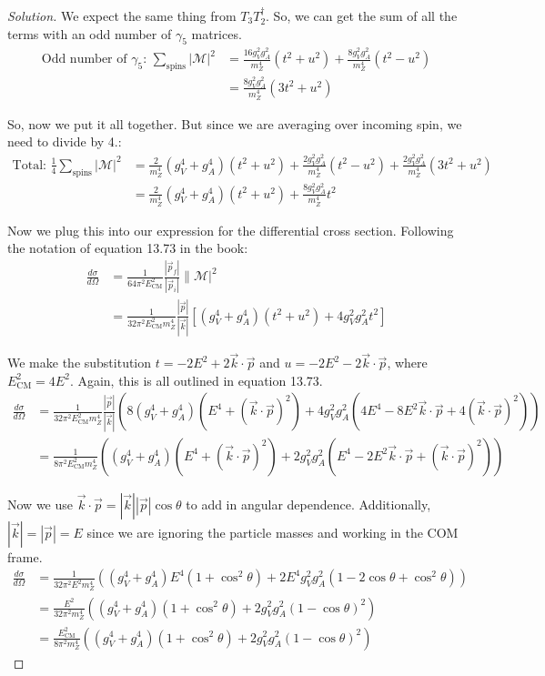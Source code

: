 \documentclass[12pt]{article}
\newenvironment{solution}{\begin{proof}[Solution]}{\end{proof}}
\begin{document}
\begin{solution}
We expect the same thing from $T_3T_2^\dagger$. So, we can get the sum of all the terms with an odd number of $\gamma_5$ matrices.
\begin{align*}
    \text{Odd number of $\gamma_5$: }\sum_\text{spins}|\mathcal{M}|^2&=\frac{16g_V^2g_A^2}{m_Z^4}(t^2+u^2)+\frac{8g_V^2g_A^2}{m_Z^4}(t^2-u^2) \\
    &=\frac{8g_V^2g_A^2}{m_Z^4}(3t^2+u^2)
\end{align*} 

So, now we put it all together. But since we are averaging over incoming spin, we need to divide by 4.:
\begin{align*}
    \text{Total: }\frac{1}{4}\sum_\text{spins}|\mathcal{M}|^2&=\frac{2}{m_Z^4}(g_V^4+g_A^4)(t^2+u^2)+\frac{2g_V^2g_A^2}{m_Z^4}(t^2-u^2)+\frac{2g_V^2g_A^2}{m_Z^4}(3t^2+u^2) \\
    &= \frac{2}{m_Z^4}(g_V^4+g_A^4)(t^2+u^2)+\frac{8g_V^2g_A^2}{m_Z^4}t^2
\end{align*}

Now we plug this into our expression for the differential cross section. Following the notation of equation 13.73 in the book:
\begin{align*}
    \frac{d\sigma}{d\Omega}&=\frac{1}{64\pi^2E_\text{CM}^2}\frac{|\vec{p}_f|}{|\vec{p}_i|}\|\mathcal{M}|^2 \\
    &=\frac{1}{32\pi^2 E_\text{CM}^2m_Z^4}\frac{|\vec{p}|}{|\vec{k}|}\left[(g_V^4+g_A^4)(t^2+u^2)+4g_V^2g_A^2t^2\right]
\end{align*}

We make the substitution $t=-2E^2+2\vec{k}\cdot\vec{p}$ and $u=-2E^2-2\vec{k}\cdot\vec{p}$, where $E_\text{CM}^2=4E^2$. Again, this is all outlined in equation 13.73.
\begin{align*}
    \frac{d\sigma}{d\Omega}&=\frac{1}{32\pi^2 E_\text{CM}^2m_Z^4}\frac{|\vec{p}|}{|\vec{k}|}\left(8(g_V^4+g_A^4)(E^4+(\vec{k}\cdot\vec{p})^2)+4g_V^2g_A^2(4E^4-8E^2\vec{k}\cdot\vec{p}+4(\vec{k}\cdot\vec{p})^2)\right) \\
    &= \frac{1}{8\pi^2 E_\text{CM}^2m_Z^4}\left((g_V^4+g_A^4)(E^4+(\vec{k}\cdot\vec{p})^2)+2g_V^2g_A^2(E^4-2E^2\vec{k}\cdot\vec{p}+(\vec{k}\cdot\vec{p})^2)\right)
\end{align*}

Now we use $\vec{k}\cdot\vec{p}=|\vec{k}||\vec{p}|\cos\theta$ to add in angular dependence. Additionally, $|\vec{k}|=|\vec{p}|=E$ since we are ignoring the particle masses and working in the COM frame.
\begin{align*}
    \frac{d\sigma}{d\Omega}&=\frac{1}{32\pi^2 E^2m_Z^4}\left((g_V^4+g_A^4)E^4(1+\cos^2\theta)+2E^4g_V^2g_A^2(1-2\cos\theta+\cos^2\theta)\right) \\
    &= \frac{E^2}{32\pi^2 m_Z^4}\left((g_V^4+g_A^4)(1+\cos^2\theta)+2g_V^2g_A^2(1-\cos\theta)^2\right) \\
    &= \frac{E_\text{CM}^2}{8\pi^2 m_Z^4}\left((g_V^4+g_A^4)(1+\cos^2\theta)+2g_V^2g_A^2(1-\cos\theta)^2\right)
\end{align*}


\end{solution}
\end{document}

